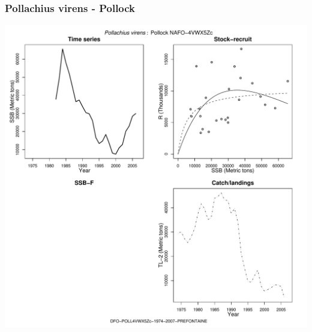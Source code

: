 \subsubsection{Pollachius virens - Pollock}
\begin{center}
\includegraphics[width=1.2\textwidth]{../R/figures/DFO-POLL4VWX5Zc-1974-2007-PREFONTAINE.pdf}
\end{center}

